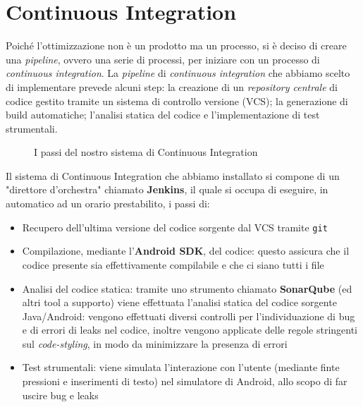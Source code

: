 \documentclass[a4paper,10pt]{memoir}
\begin{document}
\clearpage

\section{Continuous Integration}
\label{section:ci}

Poiché l'ottimizzazione non è un prodotto ma un processo, si è deciso di creare una \textit{pipeline}, ovvero una serie di processi, per iniziare con un processo di \textit{continuous integration}. La \textit{pipeline} di \textit{continuous integration} che abbiamo scelto di implementare prevede alcuni step: la creazione di un \textit{repository centrale} di codice gestito tramite un sistema di controllo versione (VCS); la generazione di build automatiche; l'analisi statica del codice e l'implementazione di test strumentali.

\begin{figure}[ht]
\centering
\caption{I passi del nostro sistema di Continuous Integration}
\end{figure}

Il sistema di Continuous Integration che abbiamo installato si compone di un "direttore d'orchestra" chiamato \textbf{Jenkins}, il quale si occupa di eseguire, in automatico ad un orario prestabilito, i passi di:
\begin{itemize}
\item Recupero dell'ultima versione del codice sorgente dal VCS tramite \texttt{git}
\item Compilazione, mediante l'\textbf{Android SDK}, del codice: questo assicura che il codice presente sia effettivamente compilabile e che ci siano tutti i file
\item Analisi del codice statica: tramite uno strumento chiamato \textbf{SonarQube} (ed altri tool a supporto) viene effettuata l'analisi statica del codice sorgente Java/Android: vengono effettuati diversi controlli per l'individuazione di bug e di errori di leaks nel codice, inoltre vengono applicate delle regole stringenti sul \textit{code-styling}, in modo da minimizzare la presenza di errori
\item Test strumentali: viene simulata l'interazione con l'utente (mediante finte pressioni e inserimenti di testo) nel simulatore di Android, allo scopo di far uscire bug e leaks
\end{itemize}
\end{document}
